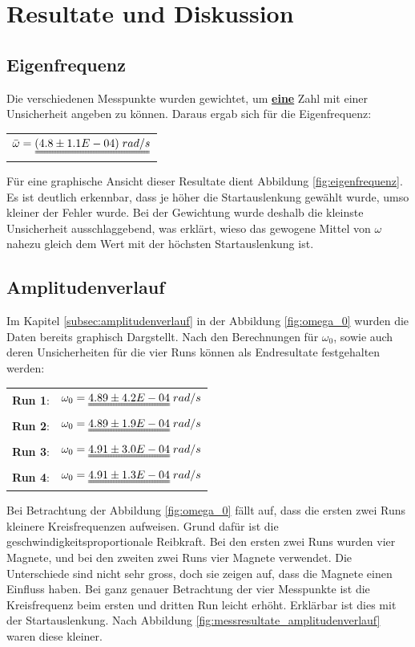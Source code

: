 \chapter{Resultate und Diskussion}
\thispagestyle{fancy}
\section{Eigenfrequenz}
Die verschiedenen Messpunkte wurden gewichtet, um \uline{\textbf{eine}} Zahl mit einer Unsicherheit angeben zu können. Daraus ergab sich für die Eigenfrequenz:
\begin{table}[H]
\centering
\begin{tabular}{l}
$\bar{\omega}=\uuline{(4.8\pm1.1E-04)\;rad/s}$
\end{tabular} 
\end{table}
Für eine graphische Ansicht dieser Resultate dient Abbildung \ref{fig:eigenfrequenz}. Es ist deutlich erkennbar, dass je höher die Startauslenkung gewählt wurde, umso kleiner der Fehler wurde. Bei der Gewichtung wurde deshalb die kleinste Unsicherheit ausschlaggebend, was erklärt, wieso das gewogene Mittel von $\omega$ nahezu gleich dem Wert mit der höchsten Startauslenkung ist.
\section{Amplitudenverlauf}
Im Kapitel \ref{subsec:amplitudenverlauf} in der Abbildung \ref{fig:omega_0} wurden die Daten bereits graphisch Dargstellt. Nach den Berechnungen für $\omega_{0}$, sowie auch deren Unsicherheiten für die vier Runs können als Endresultate festgehalten werden:
\begin{table}[H]
\centering
\begin{tabular}{ll}
\textbf{Run 1}: & $\omega_{0}=\uuline{4.89\pm4.2E-04}\;rad/s$\\
\textbf{Run 2}: & $\omega_{0}=\uuline{4.89\pm1.9E-04}\;rad/s$\\
\textbf{Run 3}: & $\omega_{0}=\uuline{4.91\pm3.0E-04}\;rad/s$\\
\textbf{Run 4}: & $\omega_{0}=\uuline{4.91\pm1.3E-04}\;rad/s$
\end{tabular} 
\end{table}
Bei Betrachtung der Abbildung \ref{fig:omega_0} fällt auf, dass die ersten zwei Runs kleinere Kreisfrequenzen aufweisen. Grund dafür ist die geschwindigkeitsproportionale Reibkraft. Bei den ersten zwei Runs wurden vier Magnete, und bei den zweiten zwei Runs vier Magnete verwendet. Die Unterschiede sind nicht sehr gross, doch sie zeigen auf, dass die Magnete einen Einfluss haben. Bei ganz genauer Betrachtung der vier Messpunkte ist die Kreisfrequenz beim ersten und dritten Run leicht erhöht. Erklärbar ist dies mit der Startauslenkung. Nach Abbildung \ref{fig:messresultate_amplitudenverlauf} waren diese kleiner.
\newpage

